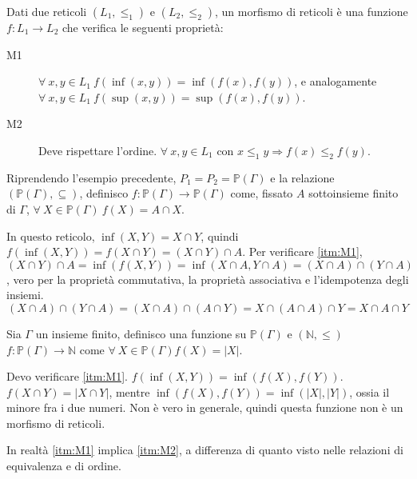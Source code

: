 \begin{defn}
Dati due reticoli $(L_1, \le_1)$ e $(L_2, \le_2)$, un morfismo di reticoli \`e una funzione $f : L_1 \to L_2$ che verifica le seguenti propriet\`a:
\begin{description}
  \item[M1\label{itm:M1}] $\forall \ x, y \in L_1 \ f(\inf(x,y)) = \inf(f(x),f(y))$, e analogamente $\forall \ x, y \in L_1 \ f(\sup(x,y)) = \sup(f(x),f(y))$.
  \item[M2\label{itm:M2}] Deve rispettare l'ordine. $\forall \ x, y \in L_1 $ con $x \le_1 y \Rightarrow f(x) \le_2 f(y)$.
\end{description}
\end{defn}

\begin{exmp}
Riprendendo l'esempio precedente, $P_1 = P_2 = \mathbb{P}(\Gamma)$ e la relazione $(\mathbb{P}(\Gamma), \subseteq)$, definisco $f : \mathbb{P}(\Gamma) \to \mathbb{P}(\Gamma)$ come, fissato $A$ sottoinsieme finito di $\Gamma$, $\forall \ X \in \mathbb{P}(\Gamma) \ f(X) = A \cap X$.

In questo reticolo, $\inf(X,Y) = X \cap Y$, quindi $f(\inf(X,Y)) = f(X \cap Y) = (X \cap Y) \cap A$. Per verificare \ref{itm:M1}, $(X \cap Y) \cap A = \inf(f(X,Y)) = \inf(X \cap A, Y \cap A) = (X \cap A) \cap (Y \cap A)$, vero per la propriet\`a commutativa, la propriet\`a associativa e l'idempotenza degli insiemi.
\[
(X \cap A) \cap (Y \cap A) = (X \cap A) \cap (A \cap Y) = X \cap (A \cap A) \cap Y = X \cap A \cap Y
\]
\end{exmp}

\begin{exmp}\label{morfismo_no_reticoli}
Sia $\Gamma$ un insieme finito, definisco una funzione su $\mathbb{P}(\Gamma)$ e $(\mathbb{N}, \le)$ $f : \mathbb{P}(\Gamma) \to \mathbb{N}$ come $\forall \ X \in \mathbb{P}(\Gamma) f(X) = |X|$.

Devo verificare \ref{itm:M1}. $f(\inf(X,Y)) = \inf(f(X),f(Y))$. $f(X \cap Y) = |X \cap Y|$, mentre $\inf(f(X),f(Y)) = \inf(|X|,|Y|)$, ossia il minore fra i due numeri. Non \`e vero in generale, quindi questa funzione non \`e un morfismo di reticoli.
\end{exmp}

In realt\`a \ref{itm:M1} implica \ref{itm:M2}, a differenza di quanto visto nelle relazioni di equivalenza e di ordine.

